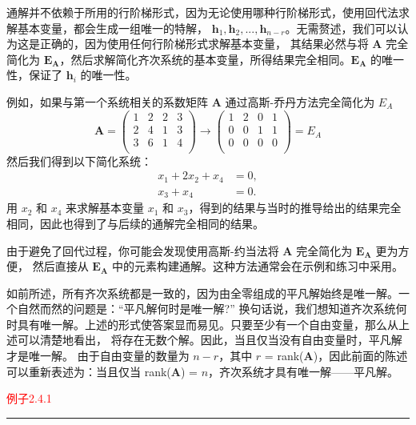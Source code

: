 通解并不依赖于所用的行阶梯形式，因为无论使用哪种行阶梯形式，使用回代法求解基本变量，都会生成一组唯一的特解，
{\(\mathbf{h}_1, \mathbf{h}_2, ..., \mathbf{h}_{n-r}\)}。无需赘述，我们可以认为这是正确的，因为使用任何行阶梯形式求解基本变量，
其结果必然与将 \(\mathbf{A}\) 完全简化为 \(\mathbf{E_A}\)，然后求解简化齐次系统的基本变量，所得结果完全相同。\(\mathbf{E_A}\) 的唯一性，保证了 \(\mathbf{h}_i\) 的唯一性。

例如，如果与第一个系统相关的系数矩阵 \(\mathbf{A}\) 通过高斯-乔丹方法完全简化为 \(E_A\)
\[
\mathbf{A} = 
\left(\begin{array}{cccc}
    1 & 2 & 2 & 3 \\
    2 & 4 & 1 & 3 \\
    3 & 6 & 1 & 4 \\
\end{array}\right)\to
\left(\begin{array}{cccc}
    1 & 2 & 0 & 1 \\
    0 & 0 & 1 & 1 \\
    0 & 0 & 0 & 0 \\
\end{array}\right)= E_A
\]
然后我们得到以下简化系统：
\[
\begin{aligned}
    x_1 + 2x_2 + x_4 &= 0, \\
    x_3 + x_4 &= 0.
\end{aligned}
\]
用 \(x_2\) 和 \(x_4\) 来求解基本变量 \(x_1\) 和 \(x_3\)，得到的结果与当时的推导给出的结果完全相同，因此也得到了与后续的通解完全相同的结果。

由于避免了回代过程，你可能会发现使用高斯-约当法将 \(\mathbf{A}\) 完全简化为 \(\mathbf{E_A}\) 更为方便，
然后直接从 \(\mathbf{E_A}\) 中的元素构建通解。这种方法通常会在示例和练习中采用。

如前所述，所有齐次系统都是一致的，因为由全零组成的平凡解始终是唯一解。一个自然而然的问题是：“平凡解何时是唯一解?”
换句话说，我们想知道齐次系统何时具有唯一解。上述的形式使答案显而易见。只要至少有一个自由变量，那么从上述可以清楚地看出，
将存在无数个解。因此，当且仅当没有自由变量时，平凡解才是唯一解。
由于自由变量的数量为 \(n - r\)，其中 \(r\) = rank(\(\mathbf{A}\))，因此前面的陈述可以重新表述为：当且仅当 rank(\(\mathbf{A}\)) = \(n\)，齐次系统才具有唯一解——平凡解。

\textcolor{red}{例子2.4.1}
\color{red}\rule{\textwidth}{0.4pt}\color{black}

